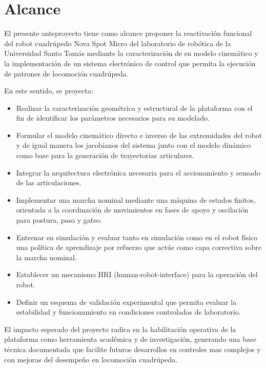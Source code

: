\chapter{Alcance}
El presente anteproyecto tiene como alcance proponer la reactivación funcional
del robot cuadrúpedo Nova Spot Micro del laboratorio de robótica de
la Universidad Santo Tomás mediante la caracterización de su modelo cinemático y la implementación de un sistema electrónico de
control que permita la ejecución de patrones de locomoción cuadrúpeda.

En este sentido, se proyecta:



\begin{itemize}

\item Realizar la caracterización geométrica y estructural de la plataforma con el
fin de identificar los parámetros necesarios para su modelado.

\item Formular el modelo cinemático directo e inverso de las extremidades del
robot y de igual manera los jacobianos del sistema junto con el modelo dinámico como base para la generación de trayectorias articulares.

\item Integrar la arquitectura electrónica necesaria para el accionamiento y
sensado de las articulaciones.

\item Implementar una marcha nominal mediante una máquina de estados finitos,
orientada a la coordinación de movimientos en fases de apoyo y oscilación para
postura, paso y gateo.

\item Entrenar en simulación y evaluar tanto en simulación como en el robot
físico una política de aprendizaje por refuerzo que actúe como capa correctiva
sobre la marcha nominal.

\item Establecer un mecanismo HRI (human-robot-interface) para la operación del
robot.

\item Definir un esquema de validación experimental que permita evaluar la
estabilidad y funcionamiento en condiciones controladas de laboratorio.

\end{itemize}

El impacto esperado del proyecto radica en la habilitación operativa de la
plataforma como herramienta académica y de investigación, generando una base
técnica documentada que facilite futuros desarrollos en controles mas complejos y con
mejoras del desempeño en locomoción cuadrúpeda.

